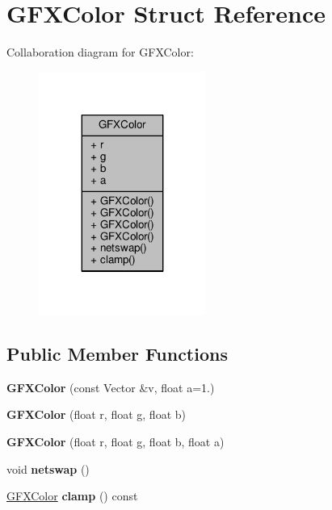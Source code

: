 \hypertarget{structGFXColor}{}\section{G\+F\+X\+Color Struct Reference}
\label{structGFXColor}


Collaboration diagram for G\+F\+X\+Color\+:
\nopagebreak
\begin{figure}[H]
\begin{center}
\leavevmode
\includegraphics[width=155pt]{d9/daa/structGFXColor__coll__graph}
\end{center}
\end{figure}
\subsection*{Public Member Functions}
\begin{DoxyCompactItemize}
\item 
{\bfseries G\+F\+X\+Color} (const Vector \&v, float a=1.)\hypertarget{structGFXColor_ab7c1ee884182ae90d92828a269f192d1}{}\label{structGFXColor_ab7c1ee884182ae90d92828a269f192d1}

\item 
{\bfseries G\+F\+X\+Color} (float r, float g, float b)\hypertarget{structGFXColor_a4784077c9d6d66cb299b8ddffcc5a084}{}\label{structGFXColor_a4784077c9d6d66cb299b8ddffcc5a084}

\item 
{\bfseries G\+F\+X\+Color} (float r, float g, float b, float a)\hypertarget{structGFXColor_a1bc2ca73ce2ecfff84f33976cb529577}{}\label{structGFXColor_a1bc2ca73ce2ecfff84f33976cb529577}

\item 
void {\bfseries netswap} ()\hypertarget{structGFXColor_a323d31d1c205778be13c1b30e43821a2}{}\label{structGFXColor_a323d31d1c205778be13c1b30e43821a2}

\item 
\hyperlink{structGFXColor}{G\+F\+X\+Color} {\bfseries clamp} () const \hypertarget{structGFXColor_aa954a59ad7b142a89cc95993c58c4a50}{}\label{structGFXColor_aa954a59ad7b142a89cc95993c58c4a50}

\end{DoxyCompactItemize}
